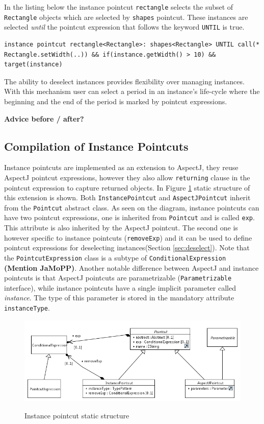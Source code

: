 \documentclass{llncs}
\begin{document}
In the listing below the instance pointcut \texttt{rectangle} selects the subset of \texttt{Rectangle} objects which are selected by \texttt{shapes} pointcut. These instances are selected \emph{until} the pointcut expression that follows the keyword \texttt{UNTIL} is true.

\begin{lstlisting}[float=h!]
instance pointcut rectangle<Rectangle>: shapes<Rectangle> UNTIL call(* Rectangle.setWidth(..)) && if(instance.getWidth() > 10) && target(instance)
\end{lstlisting}

The ability to deselect instances provides flexibility over managing instances. With this mechanism user can select a period in an instance's life-cycle where the beginning and the end of the period is marked by pointcut expressions.

\textbf{\textcolor[rgb]{1,0.41,0.13}{Advice before / after?}}

\subsection{Compilation of Instance Pointcuts}

Instance pointcuts are implemented as an extension to AspectJ, they reuse AspectJ pointcut expressions, however they also allow \texttt{returning} clause in the pointcut expression to capture returned objects. In Figure \ref{fig:ip} static structure of this extension is shown. Both \texttt{InstancePointcut} and \texttt{AspectJPointcut} inherit from the \texttt{Pointcut} abstract class. As seen on the diagram, instance pointcuts can have two pointcut expressions, one is inherited from \texttt{Pointcut} and is called \texttt{exp}. This attribute is also inherited by the AspectJ pointcut. The second one is however specific to instance pointcuts (\texttt{removeExp}) and it can be used to define pointcut expressions for deselecting instances(Section \ref{sec:deselect}). Note that the \texttt{PointcutExpression} class is a subtype of \texttt{ConditionalExpression} \textbf{\textcolor[rgb]{1,0.41,0.13}{(Mention JaMoPP)}}. Another notable difference between AspectJ and instance pointcuts is that AspectJ pointcuts are parametrizable (\texttt{Parametrizable} interface), while instance pointcuts have a single implicit parameter called \emph{instance}. The type of this parameter is stored in the mandatory attribute \texttt{instanceType}.

\begin{figure}
\centering
   \includegraphics[width=\textwidth] {images/pc.png}
   \label{fig:shapes}
\label{fig:ip}
\caption{Instance pointcut static structure}
\end{figure}
\end{document}

